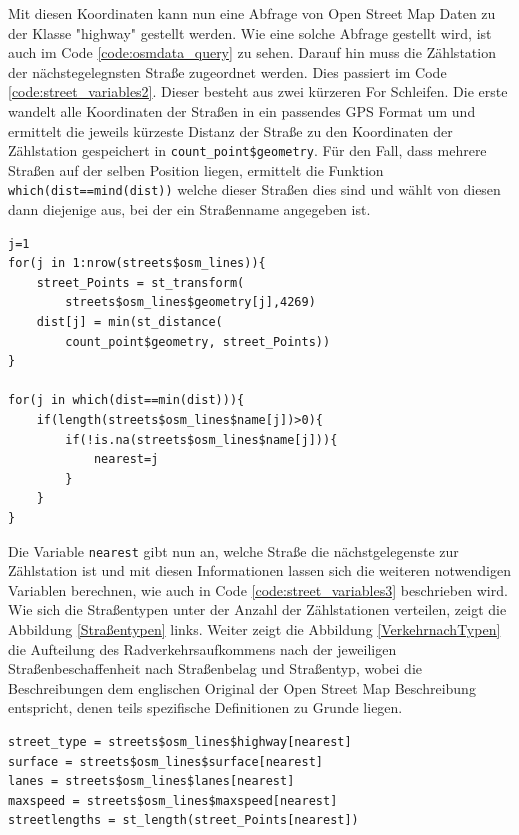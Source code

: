 \documentclass[a4paper,12pt]{thesis}
\begin{document}
Mit diesen Koordinaten kann nun eine Abfrage von Open Street Map Daten zu der Klasse "highway" gestellt werden. Wie eine solche Abfrage gestellt wird, ist auch im Code \ref{code:osmdata_query} zu sehen. Darauf hin muss die Zählstation der nächstegelegnsten Straße zugeordnet werden. Dies passiert im Code \ref{code:street_variables2}. Dieser besteht aus zwei kürzeren For Schleifen. Die erste wandelt alle Koordinaten der Straßen in ein passendes GPS Format um und ermittelt die jeweils kürzeste Distanz der Straße zu den Koordinaten der Zählstation gespeichert in \lstinline|count_point$geometry|. Für den Fall, dass mehrere Straßen auf der selben Position liegen, ermittelt die Funktion \lstinline|which(dist==mind(dist))| welche dieser Straßen dies sind und wählt von diesen dann diejenige aus, bei der ein Straßenname angegeben ist.

\begin{lstlisting}[caption={Zuordnung zur nächsten Straße},label=code:street_variables2]
j=1
for(j in 1:nrow(streets$osm_lines)){
	street_Points = st_transform(
		streets$osm_lines$geometry[j],4269)
	dist[j] = min(st_distance(
		count_point$geometry, street_Points))
}
	
for(j in which(dist==min(dist))){
	if(length(streets$osm_lines$name[j])>0){
		if(!is.na(streets$osm_lines$name[j])){
			nearest=j
		}
	}
}
\end{lstlisting}

Die Variable \lstinline|nearest| gibt nun an, welche Straße die nächstgelegenste zur Zählstation ist und mit diesen Informationen lassen sich die weiteren notwendigen Variablen berechnen, wie auch in Code \ref{code:street_variables3} beschrieben wird. Wie sich die Straßentypen unter der Anzahl der Zählstationen verteilen, zeigt die Abbildung \ref{Straßentypen} links. Weiter zeigt die Abbildung \ref{VerkehrnachTypen} die Aufteilung des Radverkehrsaufkommens nach der jeweiligen Straßenbeschaffenheit nach Straßenbelag und Straßentyp, wobei die Beschreibungen dem englischen Original der Open Street Map Beschreibung entspricht, denen teils spezifische Definitionen zu Grunde liegen.

\begin{lstlisting}[caption={Berechnung der Straßenvariablen},label=code:street_variables3]
street_type = streets$osm_lines$highway[nearest]
surface = streets$osm_lines$surface[nearest]
lanes = streets$osm_lines$lanes[nearest]
maxspeed = streets$osm_lines$maxspeed[nearest]
streetlengths = st_length(street_Points[nearest])
\end{lstlisting}
\end{document}
